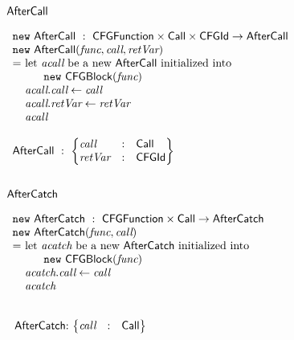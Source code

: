 \subsection{$\mbox{\textsf{AfterCall}}$}
$
\begin{array}{l@{}l@{~}l}
\lefteqn{\new \ \AfterCall \ : \ \CFGFunction \times \Call \times \CFGId \rightarrow \AfterCall} \\
\lefteqn{\new\ \AfterCall(\emph{func}, \emph{call}, \emph{retVar})}\\
& = & \text{let } \emph{acall} \text{ be a new } \AfterCall \text{ initialized into}\\
&& \quad\ \ \new\ \CFGBlock(\emph{func})\\
& & \emph{acall}.\emph{call} \leftarrow \emph{call}\\
& & \emph{acall}.\emph{retVar} \leftarrow \emph{retVar}\\
& & \emph{acall}\\\\
\lefteqn{\AfterCall \ : \
\begin{Bmatrix*}[l]
\emph{call} & : & \Call \\
\emph{retVar} & : & \CFGId \\
\end{Bmatrix*}}
\end{array}
$

\subsection{$\mbox{\textsf{AfterCatch}}$}
$
\begin{array}{l@{}l@{~}l}
\lefteqn{\new \ \AfterCatch \ : \ \CFGFunction \times \Call \rightarrow \AfterCatch}\\
\lefteqn{\new\ \AfterCatch(\emph{func}, \emph{call})}\\
& = & \text{let } \emph{acatch} \text{ be a new } \AfterCatch \text{ initialized into }\\
& & \quad\ \ \new\ \CFGBlock(\emph{func})\\
& & \emph{acatch}.\emph{call} \leftarrow \emph{call}\\
& & \emph{acatch}\\
\end{array}
$

\noindent
$
\begin{array}{@{~}r@{~}l@{}l@{~}l}
\\
& \AfterCatch & : &
\begin{Bmatrix*}[l]
\emph{call} & : & \Call \\
\end{Bmatrix*}\\
\end{array}
$

